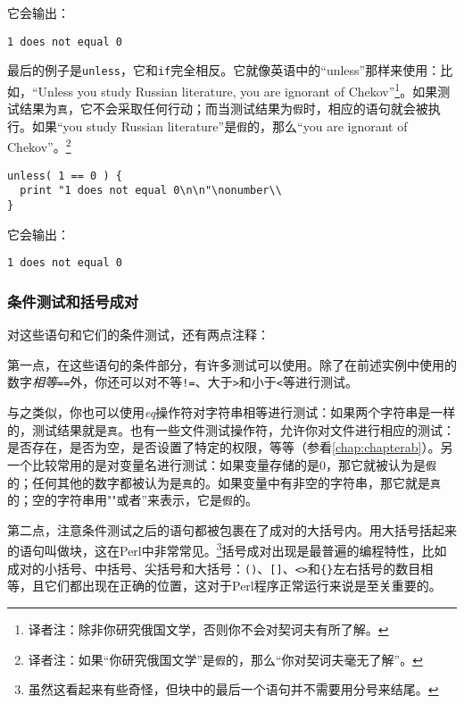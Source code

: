 它会输出：

\begin{lstlisting}
1 does not equal 0
\end{lstlisting}

最后的例子是\verb|unless|，它和\verb|if|完全相反。它就像英语中的“unless”那样来使用：比如，“Unless you study Russian literature, you are ignorant of Chekov”\footnote{译者注：除非你研究俄国文学，否则你不会对契诃夫有所了解。}。如果测试结果为\verb|真|，它不会采取任何行动；而当测试结果为\verb|假|时，相应的语句就会被执行。如果“you study Russian literature”是\verb|假|的，那么“you are ignorant of Chekov”。\footnote{译者注：如果“你研究俄国文学”是\verb|假|的，那么“你对契诃夫毫无了解”。}

\begin{lstlisting}
unless( 1 == 0 ) {
  print "1 does not equal 0\n\n"\nonumber\\
}
\end{lstlisting}

它会输出：

\begin{lstlisting}
1 does not equal 0
\end{lstlisting}

\subsubsection{条件测试和括号成对}
对这些语句和它们的条件测试，还有两点注释：

第一点，在这些语句的条件部分，有许多测试可以使用。除了在前述实例中使用的数字\textit{相等}\verb|==|外，你还可以对不等\verb|!=|、大于\verb|>|和小于\verb|<|等进行测试。

与之类似，你也可以使用\textit{eq}操作符对字符串相等进行测试：如果两个字符串是一样的，测试结果就是\verb|真|。也有一些文件测试操作符，允许你对文件进行相应的测试：是否存在，是否为空，是否设置了特定的权限，等等（参看\autoref{chap:chapterab}）。另一个比较常用的是对变量名进行测试：如果变量存储的是0，那它就被认为是\verb|假|的；任何其他的数字都被认为是\verb|真|的。如果变量中有非空的字符串，那它就是\verb|真|的；空的字符串用""或者''来表示，它是\verb|假|的。

第二点，注意条件测试之后的语句都被包裹在了成对的大括号内。用大括号括起来的语句叫做块，这在Perl中非常常见。\footnote{虽然这看起来有些奇怪，但块中的最后一个语句并不需要用分号来结尾。}括号成对出现是最普遍的编程特性，比如成对的小括号、中括号、尖括号和大括号：\verb|()|、\verb|[]|、\verb|<>|和\verb|{}|左右括号的数目相等，且它们都出现在正确的位置，这对于Perl程序正常运行来说是至关重要的。

